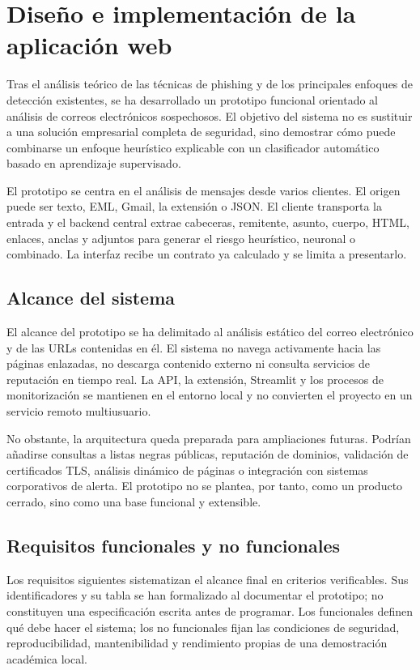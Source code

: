 \documentclass[11pt,a4paper,oneside]{report}
\begin{document}
\chapter{Diseño e implementación de la aplicación web}

Tras el análisis teórico de las técnicas de phishing y de los principales enfoques de detección existentes, se ha desarrollado un prototipo funcional orientado al análisis de correos electrónicos sospechosos. El objetivo del sistema no es sustituir a una solución empresarial completa de seguridad, sino demostrar cómo puede combinarse un enfoque heurístico explicable con un clasificador automático basado en aprendizaje supervisado.

El prototipo se centra en el análisis de mensajes desde varios clientes. El origen puede ser texto, EML, Gmail, la extensión o JSON. El cliente transporta la entrada y el backend central extrae cabeceras, remitente, asunto, cuerpo, HTML, enlaces, anclas y adjuntos para generar el riesgo heurístico, neuronal o combinado. La interfaz recibe un contrato ya calculado y se limita a presentarlo.

\section{Alcance del sistema}

El alcance del prototipo se ha delimitado al análisis estático del correo electrónico y de las URLs contenidas en él. El sistema no navega activamente hacia las páginas enlazadas, no descarga contenido externo ni consulta servicios de reputación en tiempo real. La API, la extensión, Streamlit y los procesos de monitorización se mantienen en el entorno local y no convierten el proyecto en un servicio remoto multiusuario.

No obstante, la arquitectura queda preparada para ampliaciones futuras. Podrían añadirse consultas a listas negras públicas, reputación de dominios, validación de certificados TLS, análisis dinámico de páginas o integración con sistemas corporativos de alerta. El prototipo no se plantea, por tanto, como un producto cerrado, sino como una base funcional y extensible.

\section{Requisitos funcionales y no funcionales}
\label{sec:requisitos}

Los requisitos siguientes sistematizan el alcance final en criterios verificables. Sus identificadores y su tabla se han formalizado al documentar el prototipo; no constituyen una especificación escrita antes de programar. Los funcionales definen qué debe hacer el sistema; los no funcionales fijan las condiciones de seguridad, reproducibilidad, mantenibilidad y rendimiento propias de una demostración académica local.
\end{document}
